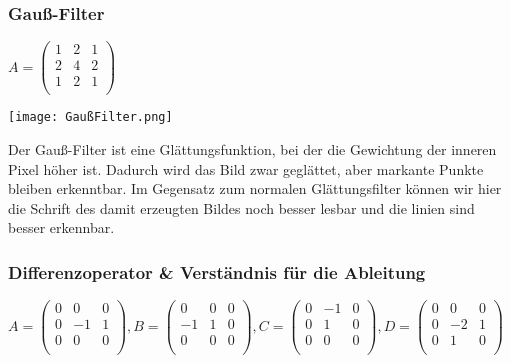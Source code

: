 \subsubsection{Gauß-Filter}

$
    A
    =
    \begin{pmatrix}
        1 & 2 & 1 \\
        2 & 4 & 2 \\
        1 & 2 & 1 \\
    \end{pmatrix}
$

\texttt{[image: GaußFilter.png]}

Der Gauß-Filter ist eine Glättungsfunktion, bei der die Gewichtung der inneren Pixel höher ist. Dadurch wird das Bild zwar geglättet, aber markante Punkte bleiben erkenntbar. Im Gegensatz zum normalen Glättungsfilter können wir hier die Schrift des damit erzeugten Bildes noch besser lesbar und die linien sind besser erkennbar.

\subsubsection{Differenzoperator \& Verständnis für die Ableitung}
\label{sec:difference-operator}

$
    A
    =
    \begin{pmatrix}
        0 & 0  & 0 \\
        0 & -1 & 1 \\
        0 & 0  & 0 \\
    \end{pmatrix}
    ,
    B
    =
    \begin{pmatrix}
        0  & 0 & 0 \\
        -1 & 1 & 0 \\
        0  & 0 & 0 \\
    \end{pmatrix}
    ,
    C
    =
    \begin{pmatrix}
        0 & -1 & 0 \\
        0 & 1  & 0 \\
        0 & 0  & 0 \\
    \end{pmatrix}
    ,
    D
    =
    \begin{pmatrix}
        0 & 0  & 0 \\
        0 & -2 & 1 \\
        0 & 1  & 0 \\
    \end{pmatrix}
$

